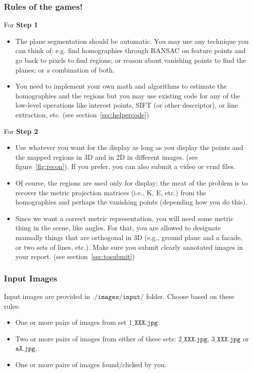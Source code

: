 \documentclass[11pt]{article}
\begin{document}
\subsubsection{Rules of the games!}
For {\bf Step 1}
\begin{itemize}
\item The plane segmentation should be automatic. You may use any technique you can
think of: e.g. find homographies through RANSAC on feature points and go back to
pixels to find regions; or reason about vanishing points to find the planes; or a combination of both.
\item You need to implement your own math and algorithms to estimate the homographies
and the regions but you may use existing code for any of the low-level operations like
interest points, SIFT (or other descriptor), or line extraction, etc. (see section~\ref{sec:helpercode})
\end{itemize}
For {\bf Step 2}
\begin{itemize}
\item Use whatever you want for the display as long as you display the points and the mapped regions in 3D and in 2D in different images. (see figure~\ref{fig:recon}). If you prefer, you can also submit a video or vrml files.
\item Of course, the regions are used only for display; the meat of the problem is to recover
the metric projection matrices (i.e., K, E, etc.) from the homographies and perhaps the
vanishing points (depending how you do this).
\item Since we want a correct metric representation, you will need some metric thing in the
scene, like angles. For that, you are allowed to designate manually things that are
orthogonal in 3D (e.g., ground plane and a facade, or two sets of lines, etc.). Make sure you submit clearly annotated images in your report. (see section~\ref{sec:tosubmit})
\end{itemize}

\subsubsection{Input Images}
\label{inp1}
Input images are provided in $\texttt{./images/input/}$ folder. Choose based on these rules:
\begin{itemize}
\item One or more pairs of images from set $1\_\texttt{XXX.jpg}$.
\item Two or more pairs of images from either of these sets: $2\_\texttt{XXX.jpg}$, $3\_\texttt{XXX.jpg}$ or $\texttt{aX.jpg}$.
\item One or more pairs of images found/clicked by you.
\end{itemize}
\end{document}
